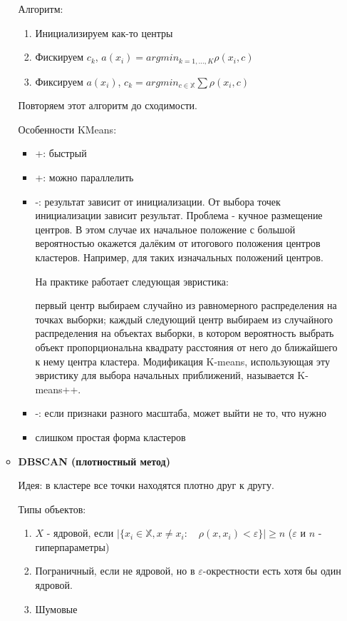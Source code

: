 \documentclass[12pt]{article}
\begin{document}
\begin{itemize}
\begin{itemize}
Алгоритм:
\begin{enumerate}
\item Инициализируем как-то центры
\item Фискируем $c_k$, $a(x_i) = argmin_{k=1,...,K} \rho(x_i, c)$
\item Фиксируем $a(x_i)$, $c_k = argmin_{c \in \mathbb{X}} \sum \rho(x_i, c)$
\end{enumerate}

Повторяем этот алгоритм до сходимости.

Особенности KMeans:
\begin{itemize}
\item +: быстрый
\item +: можно параллелить
\item -: результат зависит от инициализации. От выбора точек инициализации зависит результат. Проблема - кучное размещение центров. В этом случае их начальное положение с большой вероятностью окажется далёким от итогового положения центров кластеров. Например, для таких изначальных положений центров.

На практике работает следующая эвристика:

первый центр выбираем случайно из равномерного распределения на точках выборки;
каждый следующий центр выбираем из случайного распределения на объектах выборки, в котором вероятность выбрать объект пропорциональна квадрату расстояния от него до ближайшего к нему центра кластера.
Модификация K-means, использующая эту эвристику для выбора начальных приближений, называется K-means++.
\item -: если признаки разного масштаба, может выйти не то, что нужно
\item слишком простая форма кластеров
\end{itemize}

\item \textbf{DBSCAN (плотностный метод)}

Идея: в кластере все точки находятся плотно друг к другу.

Типы объектов:
\begin{enumerate}
\item $X$ - ядровой, если $|\{ x_i \in \mathbb{X}, x \neq x_i: \quad \rho(x, x_i) < \varepsilon \} | \geq n$ ($\varepsilon$ и $n$ - гиперпараметры)
\item Пограничный, если не ядровой, но в $\varepsilon$-окрестности есть хотя бы один ядровой.
\item Шумовые
\end{enumerate}


\end{itemize}
\end{itemize}
\end{document}
